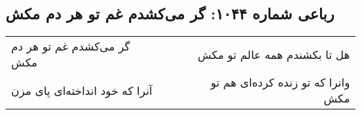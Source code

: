 \begin{center}
\section*{رباعی شماره ۱۰۴۴: گر می‌کشدم غم تو هر دم مکش}
\label{sec:1044}
\begin{longtable}{l p{0.5cm} r}
گر می‌کشدم غم تو هر دم مکش
&&
هل تا بکشندم همه عالم تو مکش
\\
آنرا که خود انداخته‌ای پای مزن
&&
وانرا که تو زنده کرده‌ای هم تو مکش
\\
\end{longtable}
\end{center}
